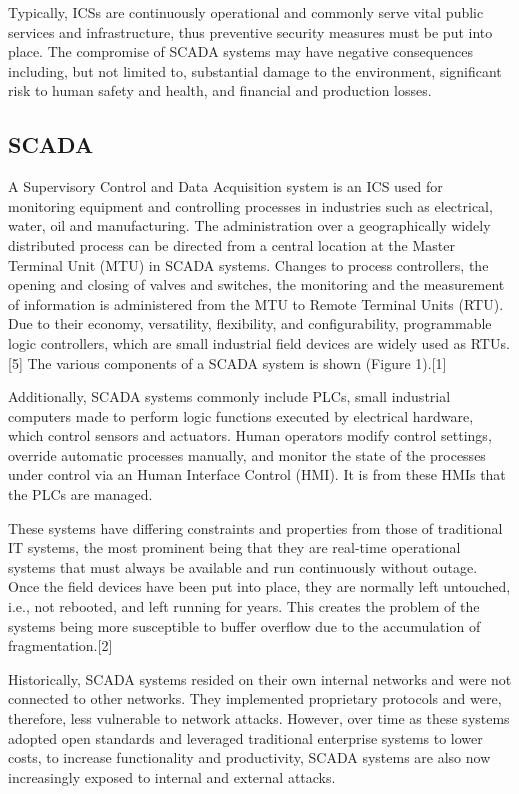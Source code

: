 \documentclass[11pt,]{article}
\begin{document}
Typically, ICSs are continuously operational and commonly serve vital
public services and infrastructure, thus preventive security measures
must be put into place. The compromise of SCADA systems may have
negative consequences including, but not limited to, substantial damage
to the environment, significant risk to human safety and health, and
financial and production losses.

\subsection{SCADA}\label{scada}

A Supervisory Control and Data Acquisition system is an ICS used for
monitoring equipment and controlling processes in industries such as
electrical, water, oil and manufacturing. The administration over a
geographically widely distributed process can be directed from a central
location at the Master Terminal Unit (MTU) in SCADA systems. Changes to
process controllers, the opening and closing of valves and switches, the
monitoring and the measurement of information is administered from the
MTU to Remote Terminal Units (RTU). Due to their economy, versatility,
flexibility, and configurability, programmable logic controllers, which
are small industrial field devices are widely used as RTUs.{[}5{]} The
various components of a SCADA system is shown (Figure 1).{[}1{]}

Additionally, SCADA systems commonly include PLCs, small industrial
computers made to perform logic functions executed by electrical
hardware, which control sensors and actuators. Human operators modify
control settings, override automatic processes manually, and monitor the
state of the processes under control via an Human Interface Control
(HMI). It is from these HMIs that the PLCs are managed.

These systems have differing constraints and properties from those of
traditional IT systems, the most prominent being that they are real-time
operational systems that must always be available and run continuously
without outage. Once the field devices have been put into place, they
are normally left untouched, i.e., not rebooted, and left running for
years. This creates the problem of the systems being more susceptible to
buffer overflow due to the accumulation of fragmentation.{[}2{]}

Historically, SCADA systems resided on their own internal networks and
were not connected to other networks. They implemented proprietary
protocols and were, therefore, less vulnerable to network attacks.
However, over time as these systems adopted open standards and leveraged
traditional enterprise systems to lower costs, to increase functionality
and productivity, SCADA systems are also now increasingly exposed to
internal and external attacks.
\end{document}
